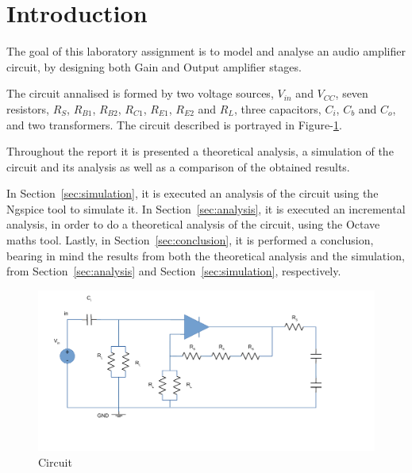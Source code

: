\section{Introduction}
\label{sec:introduction}

The goal of this laboratory assignment is to model and analyse an audio amplifier
circuit, by designing both Gain and Output amplifier stages.\par

The circuit annalised is formed by two voltage sources, $V_{in}$ and $V_{CC}$,
seven resistors, $R_S$, $R_{B1}$, $R_{B2}$, $R_{C1}$, $R_{E1}$, $R_{E2}$ and $R_L$,
three capacitors, $C_i$, $C_b$ and $C_o$, and two transformers. The circuit described
is portrayed in Figure-\ref{fig:circuit}.\par

Throughout the report it is presented a theoretical analysis, a simulation of the
circuit and its analysis as well as a comparison of the obtained results. \par

In Section~\ref{sec:simulation}, it is executed an analysis of the circuit using
the Ngspice tool to simulate it.
In Section~\ref{sec:analysis}, it is executed an incremental analysis, in order to
do a theoretical analysis of the circuit, using the Octave maths tool.
Lastly, in Section~\ref{sec:conclusion}, it is performed a conclusion, bearing in mind the
results from both the theoretical analysis and the simulation, from Section~\ref{sec:analysis}
and Section~\ref{sec:simulation}, respectively.\par


\begin{figure}[h] \centering
\includegraphics[width=1\linewidth]{circuit.pdf}
\caption{Circuit}
\label{fig:circuit}
\end{figure}

\newpage
